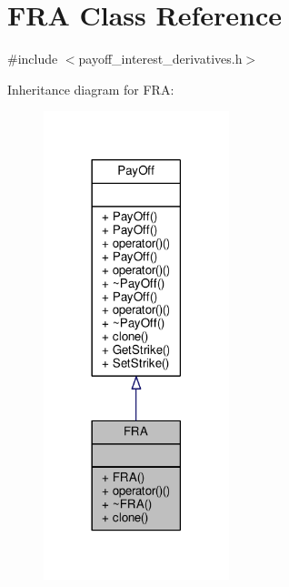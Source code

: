\hypertarget{classFRA}{}\section{F\+RA Class Reference}
\label{classFRA}


{\ttfamily \#include $<$payoff\+\_\+interest\+\_\+derivatives.\+h$>$}



Inheritance diagram for F\+RA\+:
\nopagebreak
\begin{figure}[H]
\begin{center}
\leavevmode
\includegraphics[width=153pt]{classFRA__inherit__graph}
\end{center}
\end{figure}


